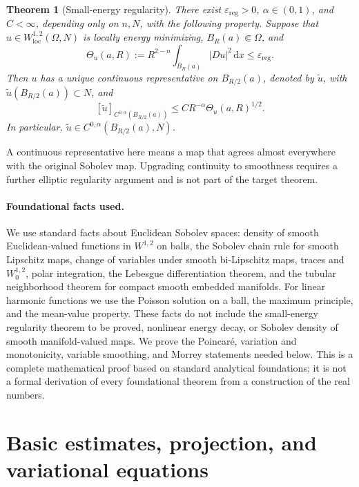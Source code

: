 \documentclass[11pt,a4paper]{article}
\numberwithin{equation}{section}
\newtheorem{theorem}{Theorem}[section]
\theoremstyle{definition}
\newcommand{\dd}{\,\mathrm d}
\newcommand{\dx}{\dd x}
\newcommand{\W}{W^{1,2}}
\newcommand{\Wo}{W^{1,2}_0}
\newcommand{\Th}{\Theta}
\begin{document}
\begin{theorem}[Small-energy regularity]\label{thm:main}
There exist $\varepsilon_{\mathrm{reg}}>0$, $\alpha\in(0,1)$, and $C<\infty$, depending only on $n,N$, with the following property. Suppose that $u\in\W_{\mathrm{loc}}(\Omega,N)$ is locally energy minimizing, $B_R(a)\Subset\Omega$, and
\begin{equation}\label{eq:small-main}
\Th_u(a,R):=R^{2-n}\int_{B_R(a)}|Du|^2\dx\le\varepsilon_{\mathrm{reg}}.
\end{equation}
Then $u$ has a unique continuous representative on $B_{R/2}(a)$, denoted by $\widetilde u$, with $\widetilde u(B_{R/2}(a))\subset N$, and
\begin{equation}\label{eq:holder-main}
[\widetilde u]_{C^{0,\alpha}(B_{R/2}(a))}
\le C R^{-\alpha}\Th_u(a,R)^{1/2}.
\end{equation}
In particular, $\widetilde u\in C^{0,\alpha}(B_{R/2}(a),N)$.
\end{theorem}

A continuous representative here means a map that agrees almost everywhere with the original Sobolev map. Upgrading continuity to smoothness requires a further elliptic regularity argument and is not part of the target theorem.

\paragraph{Foundational facts used.}
We use standard facts about Euclidean Sobolev spaces: density of smooth Euclidean-valued functions in $\W$ on balls, the Sobolev chain rule for smooth Lipschitz maps, change of variables under smooth bi-Lipschitz maps, traces and $\Wo$, polar integration, the Lebesgue differentiation theorem, and the tubular neighborhood theorem for compact smooth embedded manifolds. For linear harmonic functions we use the Poisson solution on a ball, the maximum principle, and the mean-value property. These facts do not include the small-energy regularity theorem to be proved, nonlinear energy decay, or Sobolev density of smooth manifold-valued maps. We prove the Poincaré, variation and monotonicity, variable smoothing, and Morrey statements needed below. This is a complete mathematical proof based on standard analytical foundations; it is not a formal derivation of every foundational theorem from a construction of the real numbers.

\section{Basic estimates, projection, and variational equations}
\end{document}
